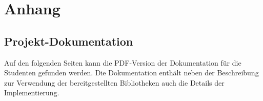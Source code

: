 \documentclass[oneside]{elaboration}
\begin{document}
\appendix{}
\chapter{Anhang}
\label{chp:anhang}

\section{Projekt-Dokumentation}
\label{sec:projekt-dokumentation}

Auf den folgenden Seiten kann die PDF-Version der Dokumentation für die
Studenten gefunden werden. Die Dokumentation enthält neben der Beschreibung zur
Verwendung der bereitgestellten Bibliotheken auch die Details der
Implementierung.
\end{document}
